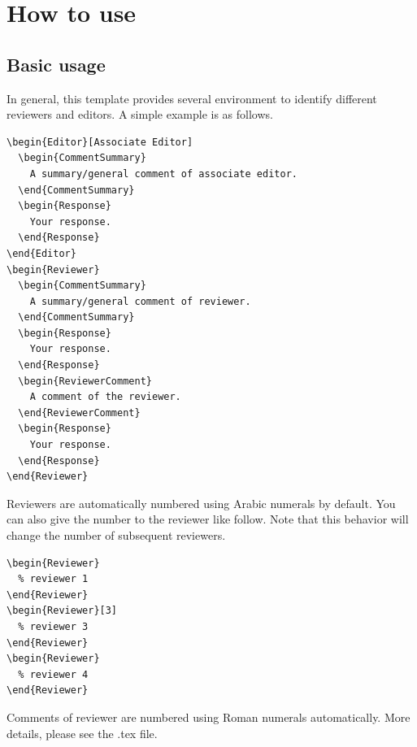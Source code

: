 \section{How to use}

\subsection{Basic usage}

In general, this template provides several environment to identify different reviewers and editors.
A simple example is as follows.

\begin{verbatim}
\begin{Editor}[Associate Editor]
  \begin{CommentSummary}
    A summary/general comment of associate editor.
  \end{CommentSummary}
  \begin{Response}
    Your response.
  \end{Response}
\end{Editor}
\begin{Reviewer}
  \begin{CommentSummary}
    A summary/general comment of reviewer.
  \end{CommentSummary}
  \begin{Response}
    Your response.
  \end{Response}
  \begin{ReviewerComment}
    A comment of the reviewer.
  \end{ReviewerComment}
  \begin{Response}
    Your response.
  \end{Response}
\end{Reviewer}
\end{verbatim}

Reviewers are automatically numbered using Arabic numerals by default.
You can also give the number to the reviewer like follow. 
Note that this behavior will change the number of subsequent reviewers.
\begin{verbatim}
\begin{Reviewer}
  % reviewer 1
\end{Reviewer}
\begin{Reviewer}[3]
  % reviewer 3
\end{Reviewer}
\begin{Reviewer}
  % reviewer 4
\end{Reviewer}
\end{verbatim}
Comments of reviewer are numbered using Roman numerals automatically.
More details, please see the .tex file.

